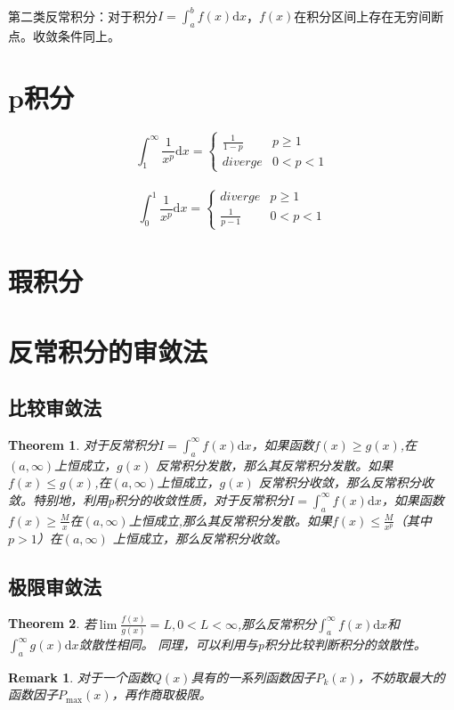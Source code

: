 \documentclass[12pt,a4paper,UTF8]{ctexbook}
\theoremstyle{plain}
\newtheorem{theorem}{\indent Theorem}[section]
\newtheorem{remark}{\indent Remark}[section]
\begin{document}
\paragraph{}第二类反常积分：对于积分$I=\int_a^b f(x)\mathrm{d}x$，$f(x)$在积分区间上存在无穷间断点。收敛条件同上。
\section{p积分}
\begin{equation}
    \int_{1}^\infty \frac{1}{x^p}\mathrm{d}x=\left\{ \begin{array}{lc}\frac{1}{1-p}&p\geq1\\diverge&0<p<1\end{array} \right.
\end{equation}
\paragraph{}
\begin{equation}
    \int_{0}^1 \frac{1}{x^p}\mathrm{d}x=\left\{ \begin{array}{lc}diverge&p\geq1\\\frac{1}{p-1}&0<p<1\end{array} \right.
\end{equation}
\section{瑕积分}
\section{反常积分的审敛法}
\subsection{比较审敛法}
\begin{theorem}
对于反常积分$I=\int^{\infty}_af(x)\mathrm{d}x$，如果函数$f(x)\geq g(x)$,在$(a,\infty)$上恒成立，$g(x)$
反常积分发散，那么其反常积分发散。如果$f(x)\leq g(x)$,在$(a,\infty)$上恒成立，$g(x)$
反常积分收敛，那么反常积分收敛。特别地，利用p积分的收敛性质，对于反常积分$I=\int^{\infty}_af(x)\mathrm{d}x$，如果函数
$f(x)\geq\frac{M}{x}$在$(a,\infty)$上恒成立,那么其反常积分发散。如果$f(x)\leq\frac{M}{x^p}$（其中$p>1$）在$(a,\infty)$
上恒成立，那么反常积分收敛。
\end{theorem}
\subsection{极限审敛法}
\begin{theorem}
若$\lim \frac{f(x)}{g(x)}=L,0<L<\infty$,那么反常积分$\int_a^\infty f(x)\mathrm{d}x$和$\int_a^{\infty}g(x)\mathrm{d}x$敛散性相同。
同理，可以利用与p积分比较判断积分的敛散性。\end{theorem}
\begin{remark}对于一个函数$Q(x)$具有的一系列函数因子$P_k(x)$，不妨取最大的函数因子$P_{\max}(x)$，再作商取极限。    
\end{remark}
\end{document}
